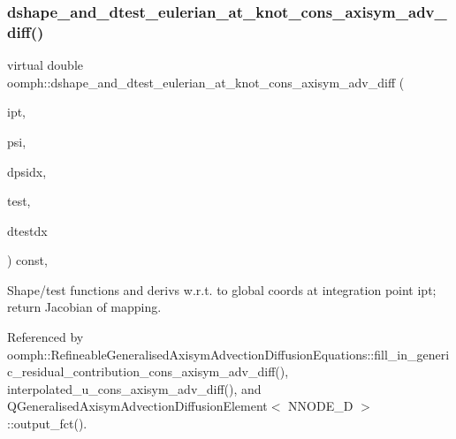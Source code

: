 \subsubsection{\texorpdfstring{dshape\+\_\+and\+\_\+dtest\+\_\+eulerian\+\_\+at\+\_\+knot\+\_\+cons\+\_\+axisym\+\_\+adv\+\_\+diff()}{dshape\_and\_dtest\_eulerian\_at\_knot\_cons\_axisym\_adv\_diff()}}
{\footnotesize\ttfamily virtual double oomph\+::dshape\+\_\+and\+\_\+dtest\+\_\+eulerian\+\_\+at\+\_\+knot\+\_\+cons\+\_\+axisym\+\_\+adv\+\_\+diff (\begin{DoxyParamCaption}\item[{const unsigned \&}]{ipt,  }\item[{\hyperlink{classoomph_1_1Shape}{Shape} \&}]{psi,  }\item[{\hyperlink{classoomph_1_1DShape}{D\+Shape} \&}]{dpsidx,  }\item[{\hyperlink{classoomph_1_1Shape}{Shape} \&}]{test,  }\item[{\hyperlink{classoomph_1_1DShape}{D\+Shape} \&}]{dtestdx }\end{DoxyParamCaption}) const\hspace{0.3cm}{\ttfamily [protected]}, {}}



Shape/test functions and derivs w.\+r.\+t. to global coords at integration point ipt; return Jacobian of mapping. 



Referenced by oomph\+::\+Refineable\+Generalised\+Axisym\+Advection\+Diffusion\+Equations\+::fill\+\_\+in\+\_\+generic\+\_\+residual\+\_\+contribution\+\_\+cons\+\_\+axisym\+\_\+adv\+\_\+diff(), interpolated\+\_\+u\+\_\+cons\+\_\+axisym\+\_\+adv\+\_\+diff(), and Q\+Generalised\+Axisym\+Advection\+Diffusion\+Element$<$ N\+N\+O\+D\+E\+\_\+D $>$\+::output\+\_\+fct().

\mbox{\label{namespaceoomph_af332902ab67ff475277342a07dcb8a9b}} 
